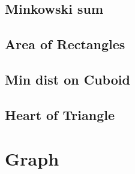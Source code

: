 \documentclass[a4paper,10pt,twocolumn,oneside]{article}
\begin{document}
%

\subsection{Minkowski sum}


%

% 

%

%

\subsection{Area of Rectangles}


\subsection{Min dist on Cuboid}


\subsection{Heart of Triangle}


\section{Graph}
\end{document}
